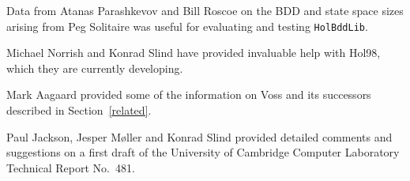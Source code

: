 \documentclass[12pt]{article}
\renewcommand{\t}[1]{\mbox{\tt #1}}
\newcommand\Hol{Hol98\xspace}
\begin{document}
Data from Atanas Parashkevov
and Bill Roscoe on the BDD and state space sizes arising from Peg Solitaire
was useful for evaluating and testing \t{HolBddLib}.

Michael Norrish and Konrad Slind have provided invaluable help with
\Hol, which they are currently developing. 

Mark Aagaard provided some
of the information on Voss and its successors described in
Section~\ref{related}.

Paul Jackson, Jesper M\o{}ller and Konrad Slind provided detailed
comments and suggestions on a first draft of the University of
Cambridge Computer Laboratory Technical Report No.~481.


  

\clearpage
{}
\printindex[MLty]

\clearpage
{}
\printindex[MLbn]
\end{document}

